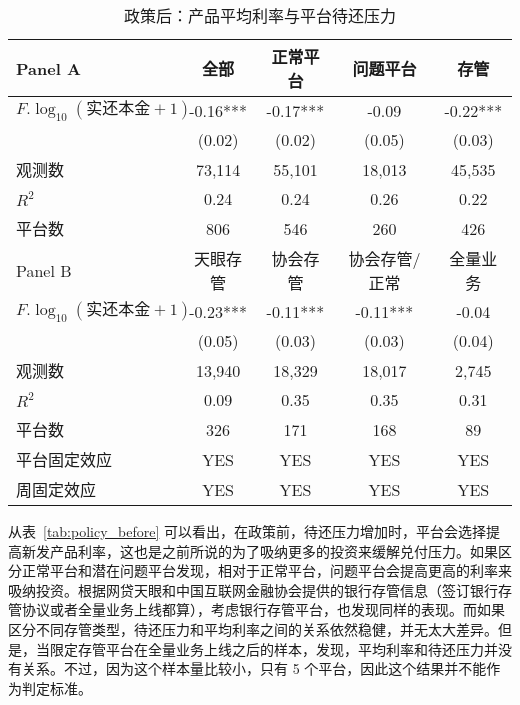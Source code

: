 \documentclass[lang=cn,11pt,authoryear]{elegantpaper}
\begin{document}
\begin{table}[htbp]
  \centering
  \caption{政策后：产品平均利率与平台待还压力}
    \begin{tabular}{lcccc}
    \toprule
    Panel A & 全部    & 正常平台  & 问题平台  & 存管 \\
    \midrule
    $F.\log_{10}(\text{实还本金}+1)$ & -0.16*** & -0.17*** & -0.09 & -0.22*** \\
          & (0.02) & (0.02) & (0.05) & (0.03) \\
    观测数   & 73,114 & 55,101 & 18,013 & 45,535 \\
    $R^{2}$    & 0.24  & 0.24  & 0.26  & 0.22 \\
    平台数   & 806   & 546   & 260   & 426 \\
    \midrule
    Panel B & 天眼存管  & 协会存管  & 协会存管/正常 & 全量业务 \\
    \midrule
    $F.\log_{10}(\text{实还本金}+1)$ & -0.23*** & -0.11*** & -0.11*** & -0.04 \\
          & (0.05) & (0.03) & (0.03) & (0.04) \\
    观测数   & 13,940 & 18,329 & 18,017 & 2,745 \\
    $R^{2}$    & 0.09  & 0.35  & 0.35  & 0.31 \\
    平台数   & 326   & 171   & 168   & 89 \\
    平台固定效应 & YES   & YES   & YES   & YES \\
    周固定效应 & YES   & YES   & YES   & YES \\
    \bottomrule
    \end{tabular}%
  \label{tab:policy_after}%
\end{table}%


从表~\ref{tab:policy_before} 可以看出，在政策前，待还压力增加时，平台会选择提高新发产品利率，这也是之前所说的为了吸纳更多的投资来缓解兑付压力。如果区分正常平台和潜在问题平台发现，相对于正常平台，问题平台会提高更高的利率来吸纳投资。根据网贷天眼和中国互联网金融协会提供的银行存管信息（签订银行存管协议或者全量业务上线都算），考虑银行存管平台，也发现同样的表现。而如果区分不同存管类型，待还压力和平均利率之间的关系依然稳健，并无太大差异。但是，当限定存管平台在全量业务上线之后的样本，发现，平均利率和待还压力并没有关系。不过，因为这个样本量比较小，只有 5 个平台，因此这个结果并不能作为判定标准。
\end{document}
